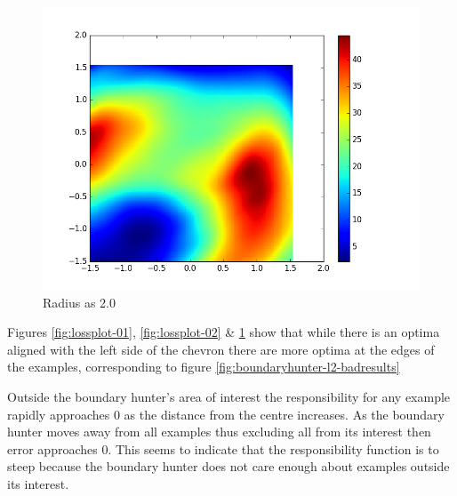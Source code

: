 \documentclass[notitlepage]{report}
\theoremstyle{definition}
\begin{document}
\begin{figure}[H]
  \centering
  \begin{minipage}[b]{0.8\textwidth}
    \includegraphics[width=\textwidth]{LossPlot-3.png}
    \caption{Radius as 2.0}
    \label{fig:lossplot-03}
  \end{minipage}
  \hfill
\end{figure}

Figures \ref{fig:lossplot-01}, \ref{fig:lossplot-02} \& \ref{fig:lossplot-03} show that while there is an optima aligned with the left side of the chevron there are more optima at the edges of the examples, corresponding to figure \ref{fig:boundaryhunter-l2-badresults}

Outside the boundary hunter's area of interest the responsibility for any example rapidly approaches 0 as the distance from the centre increases. As the boundary hunter moves away from all examples thus excluding all from its interest then error approaches 0. This seems to indicate that the responsibility function is to steep because the boundary hunter does not care enough about examples outside its interest.
\end{document}
